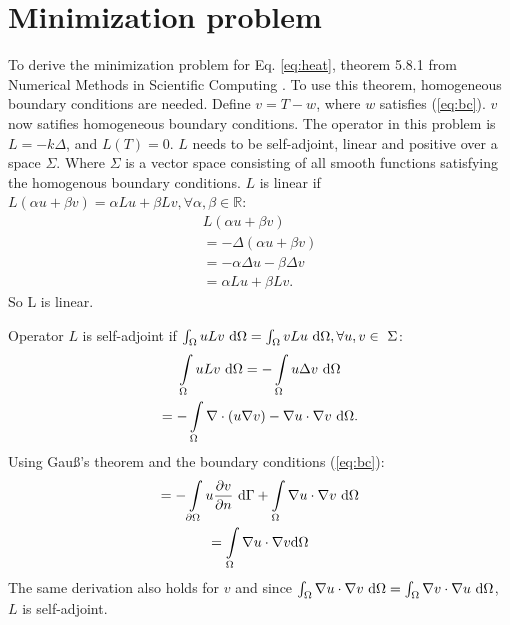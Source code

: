 \section{Minimization problem}
To derive the minimization problem for Eq. \ref{eq:heat}, theorem 5.8.1 from Numerical Methods in Scientific Computing \cite{kan}. To use this theorem, homogeneous boundary conditions are needed. Define $v=T-w$, where $w$ satisfies (\ref{eq:bc}). $v$ now satifies homogeneous boundary conditions. The operator in this problem is $L=-k\Delta$, and $L(T)=0$. $L$ needs to be self-adjoint, linear and positive over a space $\Sigma$. Where $\Sigma$ is a vector space consisting of all smooth functions satisfying the homogenous boundary conditions. $L$ is linear if $L(\alpha u+\beta v)=\alpha Lu+\beta Lv, \forall\alpha,\beta\in\mathbb{R}$:
\begin{gather*}
    L(\alpha u+\beta v)\\
    =-\Delta(\alpha u + \beta v)\\
    =-\alpha\Delta u-\beta \Delta v\\
    = \alpha Lu+\beta Lv.
\end{gather*}So L is linear.

Operator $L$ is self-adjoint if $\int\displaylimits_\Omega uLv~\text{d}\Omega=\int\displaylimits_\Omega vLu~\text{d}\Omega, \forall u,v\in~\Sigma$:
\begin{gather*}
    \int\displaylimits_\Omega uLv~\text{d}\Omega = -\int\displaylimits_\Omega u\Delta v~\text{d}\Omega\\
    =-\int\displaylimits_\Omega \nabla \cdot (u\nabla v) - \nabla u\cdot\nabla v~\text{d}\Omega.
\end{gather*}
Using Gau\ss's theorem and the boundary conditions (\ref{eq:bc}):
\begin{gather*}
    =-\int\displaylimits_{\partial\Omega} u\frac{\partial v}{\partial n}~\text{d}\Gamma + \int\displaylimits_\Omega \nabla u\cdot\nabla v~\text{d}\Omega\\
    =\int\displaylimits_\Omega \nabla u\cdot \nabla v\text{d}\Omega
\end{gather*}
The same derivation also holds for $v$ and since $\int\displaylimits_\Omega \nabla u\cdot \nabla v~\text{d}\Omega = \int\displaylimits_\Omega \nabla v\cdot \nabla u~\text{d}\Omega$, $L$ is self-adjoint.


